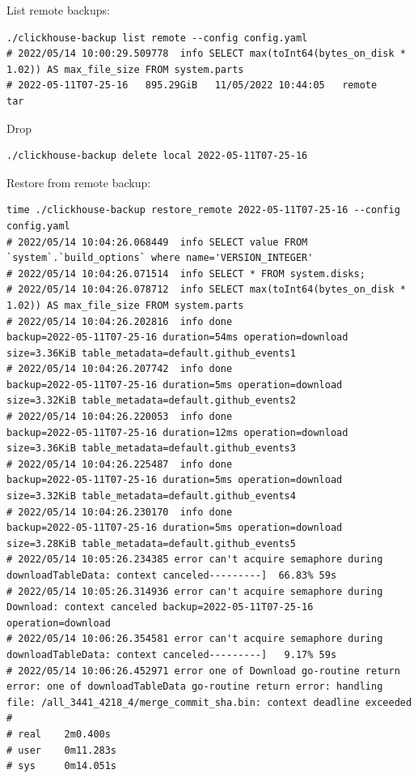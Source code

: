 List remote backups:
\begin{verbatim}
./clickhouse-backup list remote --config config.yaml
# 2022/05/14 10:00:29.509778  info SELECT max(toInt64(bytes_on_disk * 1.02)) AS max_file_size FROM system.parts
# 2022-05-11T07-25-16   895.29GiB   11/05/2022 10:44:05   remote      tar
\end{verbatim}

Drop
\begin{verbatim}
./clickhouse-backup delete local 2022-05-11T07-25-16
\end{verbatim}

Restore from remote backup:
\begin{verbatim}
time ./clickhouse-backup restore_remote 2022-05-11T07-25-16 --config config.yaml
# 2022/05/14 10:04:26.068449  info SELECT value FROM `system`.`build_options` where name='VERSION_INTEGER'
# 2022/05/14 10:04:26.071514  info SELECT * FROM system.disks;
# 2022/05/14 10:04:26.078712  info SELECT max(toInt64(bytes_on_disk * 1.02)) AS max_file_size FROM system.parts
# 2022/05/14 10:04:26.202816  info done                      backup=2022-05-11T07-25-16 duration=54ms operation=download size=3.36KiB table_metadata=default.github_events1
# 2022/05/14 10:04:26.207742  info done                      backup=2022-05-11T07-25-16 duration=5ms operation=download size=3.32KiB table_metadata=default.github_events2
# 2022/05/14 10:04:26.220053  info done                      backup=2022-05-11T07-25-16 duration=12ms operation=download size=3.36KiB table_metadata=default.github_events3
# 2022/05/14 10:04:26.225487  info done                      backup=2022-05-11T07-25-16 duration=5ms operation=download size=3.32KiB table_metadata=default.github_events4
# 2022/05/14 10:04:26.230170  info done                      backup=2022-05-11T07-25-16 duration=5ms operation=download size=3.28KiB table_metadata=default.github_events5
# 2022/05/14 10:05:26.234385 error can't acquire semaphore during downloadTableData: context canceled---------]  66.83% 59s
# 2022/05/14 10:05:26.314936 error can't acquire semaphore during Download: context canceled backup=2022-05-11T07-25-16 operation=download
# 2022/05/14 10:06:26.354581 error can't acquire semaphore during downloadTableData: context canceled---------]   9.17% 59s
# 2022/05/14 10:06:26.452971 error one of Download go-routine return error: one of downloadTableData go-routine return error: handling file: /all_3441_4218_4/merge_commit_sha.bin: context deadline exceeded
#
# real    2m0.400s
# user    0m11.283s
# sys     0m14.051s
\end{verbatim}
